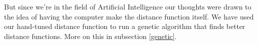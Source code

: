 \documentclass[a4paper,11pt]{article}
\begin{document}
But since we're in the field of Artificial Intelligence our thoughts
were drawn to the idea of having the computer make the distance
function itself. We have used our hand-tuned distance function to run
a genetic algorithm that finds better distance functions. More on this
in subsection \ref{genetic}.







\end{document}
